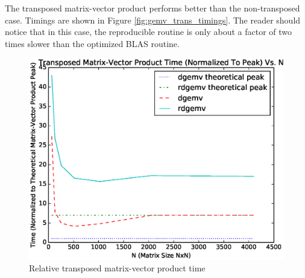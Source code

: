   The transposed matrix-vector product performs better than the non-transposed case. Timings are shown in Figure \ref{fig:gemv_trans_timings}. The reader should notice that in this case, the reproducible routine is only about a factor of two times slower than the optimized BLAS routine.
  \begin{figure}[H]
  \begin{center}
  \includegraphics[width=\textwidth]{plots/gemv_trans_comparison}
  \caption{Relative transposed matrix-vector product time}
  \label{fig:gemv_timings}
  \end{center}
  \end{figure}


